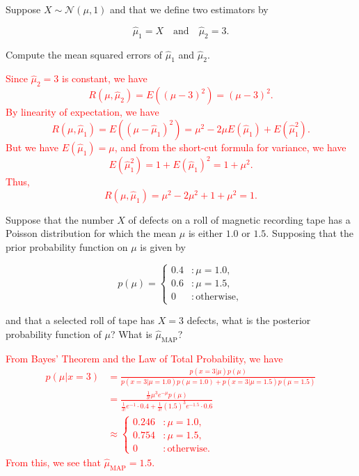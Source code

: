 \documentclass[12pt,reqno]{amsart}
\begin{document}
\bigskip

\prob Suppose $X\sim \mathcal{N}(\mu, 1)$ and that we define two estimators by

	\[\widehat{\mu}_1 = X \quad \text{and} \quad \widehat{\mu}_2 = 3.
	\]

Compute the mean squared errors of $\widehat{\mu}_1$ and $\widehat{\mu}_2$.

\bigskip
\textcolor{red}{Since $\widehat{\mu}_2=3$ is constant, we have
	\[R(\mu,\widehat{\mu}_2) = E((\mu -3)^2) = (\mu-3)^2.
	\]
By linearity of expectation, we have
	\[R(\mu,\widehat{\mu}_1) = E( (\mu - \widehat{\mu}_1)^2 ) = \mu^2 -2\mu E(\widehat{\mu}_1) + E(\widehat{\mu}_1^2) .
	\]
But we have $E(\widehat{\mu}_1) = \mu$, and from the short-cut formula for variance, we have
	\[E(\widehat{\mu}_1^2) = 1 + E(\widehat{\mu}_1)^2 = 1 + \mu^2.
	\]
Thus,
	\[R(\mu,\widehat{\mu}_1) = \mu^2 -2\mu^2 +1 + \mu^2 = 1.
	\]}

\bigskip
\prob Suppose that the number $X$ of defects on a roll of magnetic recording tape has a Poisson distribution for which the mean $\mu$ is either $1.0$ or $1.5$. Supposing that the prior probability function on $\mu$ is given by

	\[p(\mu) = \begin{cases}
	0.4 & : \mu = 1.0, \\
	0.6 & : \mu = 1.5, \\
	0 & : \text{otherwise},
	\end{cases}
	\]

and that a selected roll of tape has $X=3$ defects, what is the posterior probability function of $\mu$? What is $\widehat{\mu}_{\text{MAP}}$?

\bigskip
\textcolor{red}{From Bayes' Theorem and the Law of Total Probability, we have
	\begin{align*}
	p(\mu | x=3) &= \frac{p(x=3 | \mu)p(\mu)}{p(x=3|\mu = 1.0)p(\mu=1.0) + p(x=3|\mu = 1.5)p(\mu=1.5)} \\
	&= \frac{ \frac{1}{3!} \mu^3 e^{-\mu} p(\mu)}{\frac{1}{3!} e^{-1}\cdot 0.4 + \frac{1}{3!} (1.5)^3 e^{-1.5}\cdot 0.6} \\
	& \approx \begin{cases}
	0.246 & : \mu =1.0, \\
	0.754 & : \mu = 1.5, \\
	0 & : \text{otherwise}.
	\end{cases}
	\end{align*}
From this, we see that $\widehat{\mu}_{\text{MAP}} = 1.5$.}
\end{document}
